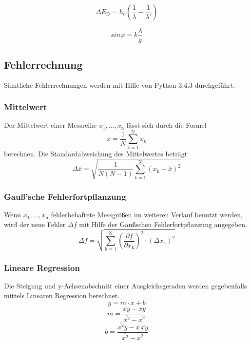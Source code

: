 \begin{equation}
  \Delta E_\text{D} = h_\text{c}\left( \frac{1}{\lambda} - \frac{1}{\lambda'} \right)
  \label{<++>}
\end{equation}

\begin{equation}
  sin \varphi = k \frac{\lambda}{g}
  \label{}
\end{equation}




\subsection{Fehlerrechnung}
Sämtliche Fehlerrechnungen werden mit Hilfe von Python 3.4.3 durchgeführt.
\subsubsection{Mittelwert}
Der Mittelwert einer Messreihe $x_\text{1}, ... ,x_\text{n}$ lässt sich durch die Formel
\begin{equation}
	\overline{x} = \frac{1}{N} \sum_{\text{k}=1}^\text{N} x_k
	\label{eqn:ave}
\end{equation}
berechnen. Die Standardabweichung des Mittelwertes beträgt
\begin{equation}
	\Delta \overline{x} = \sqrt{ \frac{1}{N(N-1)} \sum_{\text{k}=1}^\text{N} (x_\text{k} - \overline{x})^2}
	\label{eqn:std}
\end{equation}

\subsubsection{Gauß'sche Fehlerfortpflanzung}
Wenn $x_\text{1}, ..., x_\text{n}$ fehlerbehaftete Messgrößen im weiteren Verlauf benutzt werden, wird der neue Fehler $\Delta f$ mit Hilfe der Gaußschen Fehlerfortpflanzung angegeben.
\begin{equation}
	\Delta f = \sqrt{\sum_{\text{k}=1}^\text{N} \left( \frac{ \partial f}{\partial x_\text{k}} \right) ^2 \cdot (\Delta x_\text{k})^2}
	\label{eqn:var}
\end{equation}

\subsubsection{Lineare Regression}
Die Steigung und y-Achsenabschnitt einer Ausgleichsgeraden werden gegebenfalls mittels Linearen Regression berechnet.
\begin{equation}
	y = m \cdot x + b
	\label{eqn:reg}
\end{equation}
\begin{equation}
	m = \frac{ \overline{xy} - \overline{x} \overline{y} } {\overline{x^2} - \overline{x}^2}
	\label{eqn:reg_m}
\end{equation}
\begin{equation}
	b = \frac{ \overline{x^2}\overline{y} - \overline{x} \, \overline{xy}} { \overline{x^2} - \overline{x}^2}
	\label{eqn:reg_b}
\end{equation}
